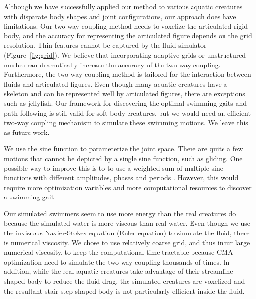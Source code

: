 Although we have successfully applied our method to various aquatic
creatures with disparate body shapes and joint configurations, our approach does
have limitations. Our two-way coupling method needs to voxelize the articulated rigid body,
and the accuracy for representing the articulated figure depends on the grid
resolution. Thin features cannot be captured by the fluid simulator (Figure~\ref{fig:grid}). We believe that incorporating adaptive grids
\cite{Losasso04Octree} or unstructured meshes
\cite{Brochu10MatchingElement,klingner2006mesh} can dramatically increase
the accuracy of the two-way coupling. Furthermore, the two-way coupling
method is tailored for the interaction between fluids and articulated
figures. Even though many aquatic creatures have a skeleton and can be
represented well by articulated figures, there are exceptions such as
jellyfish. Our framework for discovering the optimal swimming gaits and
path following is still valid for soft-body creatures, but we would need
an efficient two-way coupling mechanism to simulate these swimming
motions. We leave this as future work.

We use the sine function to parameterize the joint space. There
are quite a few motions that cannot be depicted by a single sine function,
such as gliding. One possible way to improve this is to to use a weighted
sum of multiple sine functions with different amplitudes, phases and
periods \cite{Grzeszczuk95automatedlearning}. However, this would require more
optimization variables and more computational resources to discover a
swimming gait. 

Our simulated swimmers seem to use more energy than the real creatures do because the simulated water is more viscous than real water. Even though we use the inviscous Navier-Stokes equation (Euler equation) to simulate the fluid, there is numerical viscosity. We chose to use relatively coarse grid, and thus incur large numerical viscosity, to keep the computational time tractable because CMA optimization need to simulate the two-way coupling thousands of times. In addition, while the real aquatic creatures take advantage of their streamline shaped body to reduce the fluid drag, the simulated creatures are voxelized and the resultant stair-step shaped body is not particularly efficient inside the fluid.

